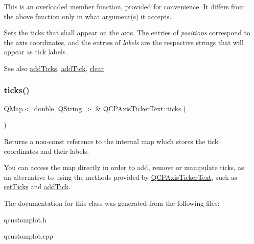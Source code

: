 This is an overloaded member function, provided for convenience. It differs from the above function only in what argument(s) it accepts.

Sets the ticks that shall appear on the axis. The entries of {\itshape positions} correspond to the axis coordinates, and the entries of {\itshape labels} are the respective strings that will appear as tick labels.

\begin{DoxySeeAlso}{See also}
\hyperlink{class_q_c_p_axis_ticker_text_aba34051300eecaefbedb2df8feff2d45}{add\+Ticks}, \hyperlink{class_q_c_p_axis_ticker_text_aada3db69e5fc6585aaa4ea5d89552eb0}{add\+Tick}, \hyperlink{class_q_c_p_axis_ticker_text_a21826d2fcd9a25c194d34d4f67aa1460}{clear} 
\end{DoxySeeAlso}
\mbox{\label{class_q_c_p_axis_ticker_text_ac84622a6bb4f2a98474e185ecaf3189a}} 
\subsubsection{\texorpdfstring{ticks()}{ticks()}}
{\footnotesize\ttfamily Q\+Map$<$ double, Q\+String $>$ \& Q\+C\+P\+Axis\+Ticker\+Text\+::ticks (\begin{DoxyParamCaption}{ }\end{DoxyParamCaption})\hspace{0.3cm}{\ttfamily [inline]}}

Returns a non-\/const reference to the internal map which stores the tick coordinates and their labels.

You can access the map directly in order to add, remove or manipulate ticks, as an alternative to using the methods provided by \hyperlink{class_q_c_p_axis_ticker_text}{Q\+C\+P\+Axis\+Ticker\+Text}, such as \hyperlink{class_q_c_p_axis_ticker_text_a8cdf1f21940f1f53f5e3d30b2c74f5cf}{set\+Ticks} and \hyperlink{class_q_c_p_axis_ticker_text_aada3db69e5fc6585aaa4ea5d89552eb0}{add\+Tick}. 

The documentation for this class was generated from the following files\+:\begin{DoxyCompactItemize}
\item 
qcustomplot.\+h\item 
qcustomplot.\+cpp\end{DoxyCompactItemize}
